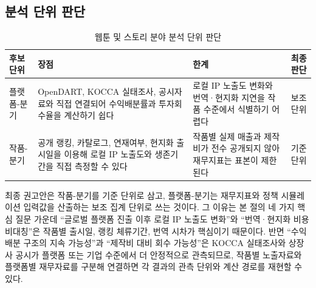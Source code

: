 \documentclass[11pt,a4paper]{report}
\begin{document}
\subsection{분석 단위 판단}
\begin{table}[H]
  \centering
  \small
  \caption{웹툰 및 스토리 분야 분석 단위 판단}\label{tab:webtoon_unit_choice}
  \begin{tabular}{p{2.8cm}p{4.6cm}p{4.6cm}p{2.2cm}}
    \toprule
    \rowcolor{ReportTableHead}
    후보 단위 & 장점 & 한계 & 최종 판단 \\
    \midrule
    플랫폼-분기 & OpenDART, KOCCA 실태조사, 공시자료와 직접 연결되어 수익배분률과 투자회수율을 계산하기 쉽다 & 로컬 IP 노출도 변화와 번역·현지화 지연을 작품 수준에서 식별하기 어렵다 & 보조 단위 \\
    작품-분기 & 공개 랭킹, 카탈로그, 연재여부, 현지화 출시일을 이용해 로컬 IP 노출도와 생존기간을 직접 측정할 수 있다 & 작품별 실제 매출과 제작비가 전수 공개되지 않아 재무지표는 표본이 제한된다 & 기준 단위 \\
    \bottomrule
  \end{tabular}
\end{table}

최종 권고안은 작품-분기를 기준 단위로 삼고, 플랫폼-분기는 재무지표와 정책 시뮬레이션 입력값을 산출하는 보조 집계 단위로 쓰는 것이다. 그 이유는 본 절의 네 가지 핵심 질문 가운데 ``글로벌 플랫폼 진출 이후 로컬 IP 노출도 변화''와 ``번역·현지화 비용 비대칭''은 작품별 출시일, 랭킹 체류기간, 번역 시차가 핵심이기 때문이다. 반면 ``수익 배분 구조의 지속 가능성''과 ``제작비 대비 회수 가능성''은 KOCCA 실태조사와 상장사 공시가 플랫폼 또는 기업 수준에서 더 안정적으로 관측되므로, 작품별 노출자료와 플랫폼별 재무자료를 구분해 연결하면 각 결과의 관측 단위와 계산 경로를 재현할 수 있다.
\end{document}
